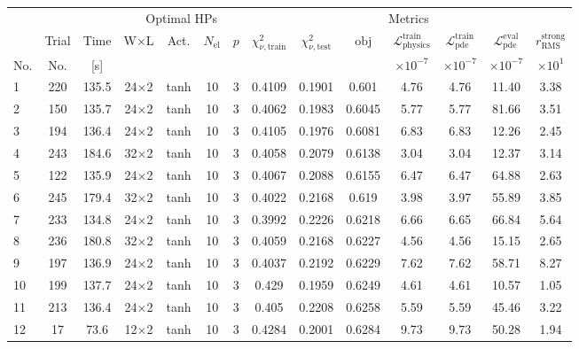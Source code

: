 \begin{tabular}{lcc cccc ccccccc}
\toprule
& & & \multicolumn{4}{c}{Optimal HPs} & \multicolumn{7}{c}{Metrics} \\
\cmidrule(lr){4-7}\cmidrule(lr){8-14}
& Trial & Time & W$\times$L & Act. & $N_{\mathrm{el}}$ & $p$ & $\chi^2_{\nu,\mathrm{train}}$ & $\chi^2_{\nu,\mathrm{test}}$ & $\mathrm{obj}$ & $\mathcal{L}_{\mathrm{physics}}^{\mathrm{train}}$ & $\mathcal{L}_{\mathrm{pde}}^{\mathrm{train}}$ & $\mathcal{L}_{\mathrm{pde}}^{\mathrm{eval}}$ & $r_{\mathrm{RMS}}^{\mathrm{strong}}$ \\
No. & No. & [s] &  &  &  &  &  &  &  & $\times 10^{-7}$ & $\times 10^{-7}$ & $\times 10^{-7}$ & $\times 10^{1}$ \\
\midrule
  1 & 220 & 135.5 & 24$\times$2 & tanh & 10 & 3 & \num{0.4109} & \num{0.1901} & \num{0.601} & 4.76 & 4.76 & 11.40 & 3.38 \\
  2 & 150 & 135.7 & 24$\times$2 & tanh & 10 & 3 & \num{0.4062} & \num{0.1983} & \num{0.6045} & 5.77 & 5.77 & 81.66 & 3.51 \\
  3 & 194 & 136.4 & 24$\times$2 & tanh & 10 & 3 & \num{0.4105} & \num{0.1976} & \num{0.6081} & 6.83 & 6.83 & 12.26 & 2.45 \\
  4 & 243 & 184.6 & 32$\times$2 & tanh & 10 & 3 & \num{0.4058} & \num{0.2079} & \num{0.6138} & 3.04 & 3.04 & 12.37 & 3.14 \\
  5 & 122 & 135.9 & 24$\times$2 & tanh & 10 & 3 & \num{0.4067} & \num{0.2088} & \num{0.6155} & 6.47 & 6.47 & 64.88 & 2.63 \\
  6 & 245 & 179.4 & 32$\times$2 & tanh & 10 & 3 & \num{0.4022} & \num{0.2168} & \num{0.619} & 3.98 & 3.97 & 55.89 & 3.85 \\
  7 & 233 & 134.8 & 24$\times$2 & tanh & 10 & 3 & \num{0.3992} & \num{0.2226} & \num{0.6218} & 6.66 & 6.65 & 66.84 & 5.64 \\
  8 & 236 & 180.8 & 32$\times$2 & tanh & 10 & 3 & \num{0.4059} & \num{0.2168} & \num{0.6227} & 4.56 & 4.56 & 15.15 & 2.65 \\
  9 & 197 & 136.9 & 24$\times$2 & tanh & 10 & 3 & \num{0.4037} & \num{0.2192} & \num{0.6229} & 7.62 & 7.62 & 58.71 & 8.27 \\
  10 & 199 & 137.7 & 24$\times$2 & tanh & 10 & 3 & \num{0.429} & \num{0.1959} & \num{0.6249} & 4.61 & 4.61 & 10.57 & 1.05 \\
  11 & 213 & 136.4 & 24$\times$2 & tanh & 10 & 3 & \num{0.405} & \num{0.2208} & \num{0.6258} & 5.59 & 5.59 & 45.46 & 3.22 \\
  12 & 17 & 73.6 & 12$\times$2 & tanh & 10 & 3 & \num{0.4284} & \num{0.2001} & \num{0.6284} & 9.73 & 9.73 & 50.28 & 1.94 \\

\end{tabular}
